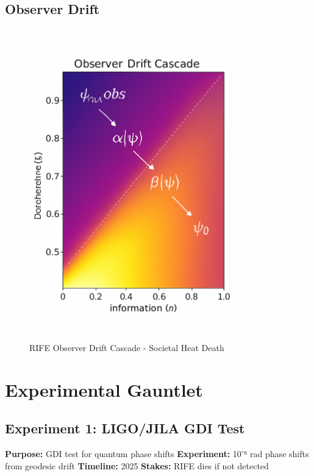 \documentclass[11pt]{report}
\begin{document}
\subsection{Observer Drift}
\begin{figure}[ht]
  \centering
  \includegraphics[width=0.8\textwidth]{simulations/observer_drift.png}
  \caption{RIFE Observer Drift Cascade - Societal Heat Death}
\end{figure}

\section{Experimental Gauntlet}

\subsection{Experiment 1: LIGO/JILA GDI Test}
\textbf{Purpose:} GDI test for quantum phase shifts
\textbf{Experiment:} 10⁻⁶ rad phase shifts from geodesic drift
\textbf{Timeline:} 2025
\textbf{Stakes:} RIFE dies if not detected
\end{document}
